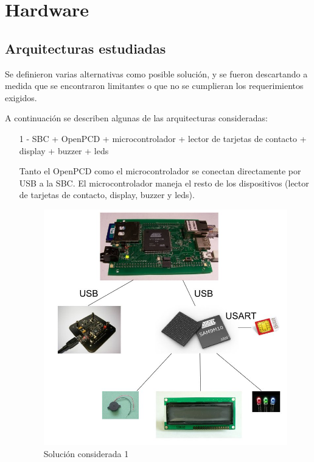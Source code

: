 \chapter{Hardware}

\section{Arquitecturas estudiadas}
Se definieron varias alternativas como posible solución, y se fueron descartando a medida que se encontraron limitantes o que no se cumplieran los requerimientos exigidos.

A continuación se describen algunas de las arquitecturas consideradas:

\begin{itemize}
\item[1 -] SBC + OpenPCD + microcontrolador + lector de tarjetas de contacto + display + buzzer + leds
\bigskip

Tanto el OpenPCD como el microcontrolador se conectan directamente por USB a la SBC. El microcontrolador maneja el resto de los dispositivos (lector de tarjetas de contacto, display, buzzer y leds).

\begin{figure}[H]
\centering
  \begin{center}
  \includegraphics[scale=.25]{Imagenes/1.jpg} 
  \end{center}
  \caption{Solución considerada 1}\label{Fig:HW} 
\end{figure}


\end{itemize}
